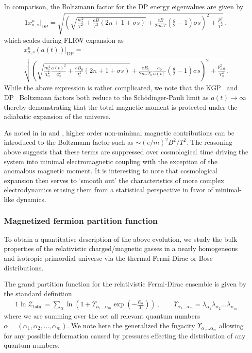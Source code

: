 In comparison, the Boltzmann factor for the DP energy eigenvalues are given by
\begin{alignat}{1}
    \label{xscaledp:1} x_{\sigma,s}^{n}\vert_\mathrm{DP} = \sqrt{\left(\sqrt{\frac{m_{e}^{2}}{T^{2}}+\frac{eB}{T^{2}}\left(2n+1+\sigma s\right)}+\frac{eB}{2m_{e}T}\left(\frac{g}{2}-1\right)\sigma s\right)^{2}+\frac{p_{z}^{2}}{T^{2}}}\,,
\end{alignat}
which scales during FLRW expansion as
\begin{multline}
    \label{xscaledp:2} x_{\sigma,s}^{n}(a(t))\vert_\mathrm{DP} =\\ \sqrt{\left(\sqrt{\frac{m_{e}^{2}}{T_{0}^{2}}\frac{a(t)^{2}}{a_{0}^{2}}+\frac{eB_{0}}{T_{0}^{2}}\left(2n+1+\sigma s\right)}+\frac{eB_{0}}{2m_{e}T_{0}}\frac{a_{0}}{a(t)}\left(\frac{g}{2}-1\right)\sigma s\right)^{2}+\frac{p_{z,0}^{2}}{T_{0}^{2}}}\,.
\end{multline}
While the above expression is rather complicated, we note that the KGP~ and DP~ Boltzmann factors both reduce to the Sch{\"o}dinger-Pauli limit as $a(t)\rightarrow\infty$ thereby demonstrating that the total magnetic moment is protected under the adiabatic expansion of the universe.

As noted in in  and , higher order non-minimal magnetic contributions can be introduced to the Boltzmann factor such as $\sim(e/m)^{2}B^{2}/T^{2}$. The reasoning above suggests that these terms are suppressed over cosmological time driving the system into minimal electromagnetic coupling with the exception of the anomalous magnetic moment. It is interesting to note that cosmological expansion then serves to `smooth out' the characteristics of more complex electrodynamics erasing them from a statistical perspective in favor of minimal-like dynamics.

\subsubsection{Magnetized fermion partition function}
\label{sec:partition}
\noindent To obtain a quantitative description of the above evolution, we study the bulk properties of the relativistic charged/magnetic gasses in a nearly homogeneous and isotropic primordial universe via the thermal Fermi-Dirac or Bose distributions.

The grand partition function for the relativistic Fermi-Dirac ensemble is given by the standard definition
\begin{alignat}{1}
    \label{part:1} \ln\mathcal{Z}_\mathrm{total}=\sum_{\alpha}\ln\left(1+\Upsilon_{\alpha_{1}\ldots\alpha_{m}}\exp\left(-\frac{E_{\alpha}}{T}\right)\right)\,,\qquad\Upsilon_{\alpha_{1}\ldots\alpha_{m}}=\lambda_{\alpha_{1}}\lambda_{\alpha_{2}}\ldots\lambda_{\alpha_{m}}
\end{alignat}
where we are summing over the set all relevant quantum numbers $\alpha=(\alpha_{1},\alpha_{2},\ldots,\alpha_{m})$. We note here the generalized the fugacity $\Upsilon_{\alpha_{1}\ldots\alpha_{m}}$ allowing for any possible deformation caused by pressures effecting the distribution of any quantum numbers.

